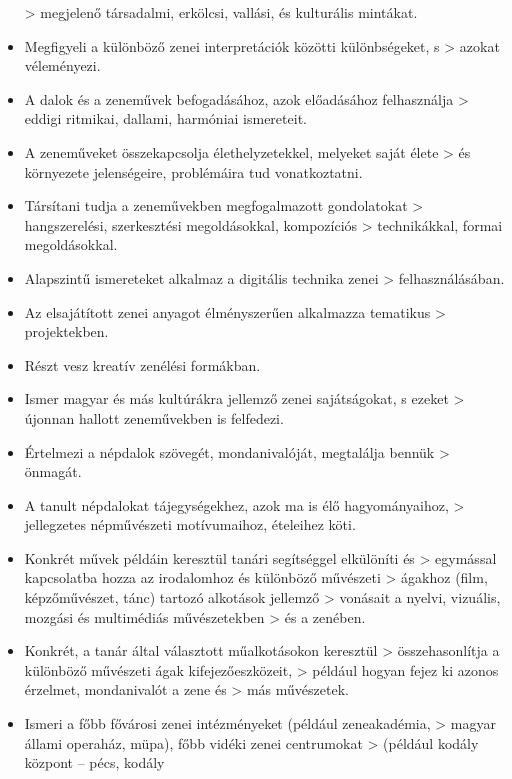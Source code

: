 \begin{itemize}
  \textgreater{} megjelenő társadalmi, erkölcsi, vallási, és kulturális
  mintákat.
\item
  Megfigyeli a különböző zenei interpretációk közötti különbségeket, s
  \textgreater{} azokat véleményezi.
\item
  A dalok és a zeneművek befogadásához, azok előadásához felhasználja
  \textgreater{} eddigi ritmikai, dallami, harmóniai ismereteit.
\item
  A zeneműveket összekapcsolja élethelyzetekkel, melyeket saját élete
  \textgreater{} és környezete jelenségeire, problémáira tud
  vonatkoztatni.
\item
  Társítani tudja a zeneművekben megfogalmazott gondolatokat
  \textgreater{} hangszerelési, szerkesztési megoldásokkal, kompozíciós
  \textgreater{} technikákkal, formai megoldásokkal.
\item
  Alapszintű ismereteket alkalmaz a digitális technika zenei
  \textgreater{} felhasználásában.
\item
  Az elsajátított zenei anyagot élményszerűen alkalmazza tematikus
  \textgreater{} projektekben.
\item
  Részt vesz kreatív zenélési formákban.
\item
  Ismer magyar és más kultúrákra jellemző zenei sajátságokat, s ezeket
  \textgreater{} újonnan hallott zeneművekben is felfedezi.
\item
  Értelmezi a népdalok szövegét, mondanivalóját, megtalálja bennük
  \textgreater{} önmagát.
\item
  A tanult népdalokat tájegységekhez, azok ma is élő hagyományaihoz,
  \textgreater{} jellegzetes népművészeti motívumaihoz, ételeihez köti.
\item
  Konkrét művek példáin keresztül tanári segítséggel elkülöníti és
  \textgreater{} egymással kapcsolatba hozza az irodalomhoz és különböző
  művészeti \textgreater{} ágakhoz (film, képzőművészet, tánc) tartozó
  alkotások jellemző \textgreater{} vonásait a nyelvi, vizuális, mozgási
  és multimédiás művészetekben \textgreater{} és a zenében.
\item
  Konkrét, a tanár által választott műalkotásokon keresztül
  \textgreater{} összehasonlítja a különböző művészeti ágak
  kifejezőeszközeit, \textgreater{} például hogyan fejez ki azonos
  érzelmet, mondanivalót a zene és \textgreater{} más művészetek.
\item
  Ismeri a főbb fővárosi zenei intézményeket (például zeneakadémia,
  \textgreater{} magyar állami operaház, müpa), főbb vidéki zenei
  centrumokat \textgreater{} (például kodály központ -- pécs, kodály

\end{itemize}
